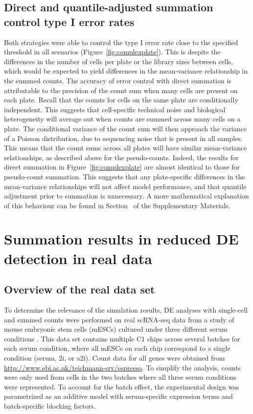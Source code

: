 \documentclass[oupdraft]{bio}
\begin{document}
\subsection{Direct and quantile-adjusted summation control type I error rates}
Both strategies were able to control the type I error rate close to the specified threshold in all scenarios (Figure~\ref{fig:complexplate}).
This is despite the differences in the number of cells per plate or the library sizes between cells,
    which would be expected to yield differences in the mean-variance relationship in the summed counts.
The accuracy of error control with direct summation is attributable to the precision of the count sum when many cells are present on each plate.
Recall that the counts for cells on the same plate are conditionally independent. 
This suggests that cell-specific technical noise and biological heterogeneity will average out when counts are summed across many cells on a plate.
The conditional variance of the count sum will then approach the variance of a Poisson distribution, due to sequencing noise \citep{marioni2008rnaseq} that is present in all samples.
This means that the count sums across all plates will have similar mean-variance relationships, as described above for the pseudo-counts.
Indeed, the results for direct summation in Figure~\ref{fig:complexplate} are almost identical to those for pseudo-count summation.
This suggests that any plate-specific differences in the mean-variance relationships will not affect model performance, and that quantile adjustment prior to summation is unnecessary.
A more mathematical explanation of this behaviour can be found in Section~\suppmeanvar{} of the Supplementary Materials.

\section{Summation results in reduced DE detection in real data}

\subsection{Overview of the real data set}
To determine the relevance of the simulation results, DE analyses with single-cell and summed counts were performed on real scRNA-seq data from a study of mouse embryonic stem cells (mESCs) cultured under three different serum conditions \citep{kolod2015single}.
This data set contains multiple C1 chips across several batches for each serum condition, where all mESCs on each chip correspond to a single condition (serum, 2i, or a2i). 
Count data for all genes were obtained from \url{http://www.ebi.ac.uk/teichmann-srv/espresso}.
To simplify the analysis, counts were only used from cells in the two batches where all three serum conditions were represented.
To account for the batch effect, the experimental design was parametrized as an additive model with serum-specific expression terms and batch-specific blocking factors.
\end{document}
